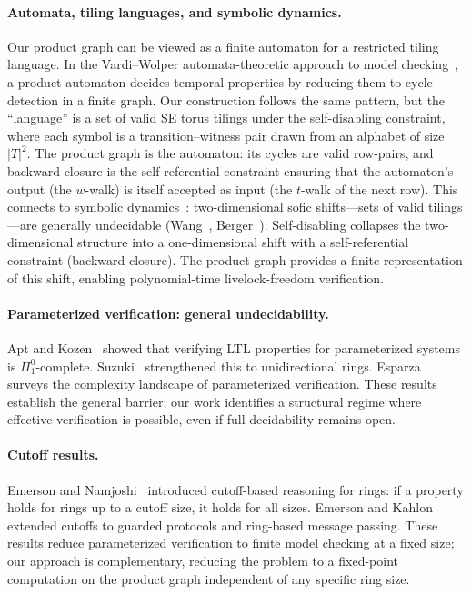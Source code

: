 \documentclass[11pt]{article}
\begin{document}
\paragraph{Automata, tiling languages, and symbolic dynamics.} Our product graph can be viewed as a finite automaton for a restricted tiling language. In the Vardi--Wolper automata-theoretic approach to model checking~\cite{vardi-wolper}, a product automaton decides temporal properties by reducing them to cycle detection in a finite graph. Our construction follows the same pattern, but the ``language'' is a set of valid SE torus tilings under the self-disabling constraint, where each symbol is a transition--witness pair drawn from an alphabet of size $|T|^2$. The product graph is the automaton: its cycles are valid row-pairs, and backward closure is the self-referential constraint ensuring that the automaton's output (the $w$-walk) is itself accepted as input (the $t$-walk of the next row). This connects to symbolic dynamics~\cite{lind-marcus}: two-dimensional sofic shifts---sets of valid tilings---are generally undecidable (Wang~\cite{wang-tiles}, Berger~\cite{berger}). Self-disabling collapses the two-dimensional structure into a one-dimensional shift with a self-referential constraint (backward closure). The product graph provides a finite representation of this shift, enabling polynomial-time livelock-freedom verification.

\paragraph{Parameterized verification: general undecidability.} Apt and Kozen~\cite{apt-kozen} showed that verifying LTL properties for parameterized systems is $\Pi^0_1$-complete. Suzuki~\cite{suzuki} strengthened this to unidirectional rings. Esparza~\cite{esparza} surveys the complexity landscape of parameterized verification. These results establish the general barrier; our work identifies a structural regime where effective verification is possible, even if full decidability remains open.

\paragraph{Cutoff results.} Emerson and Namjoshi~\cite{emerson-namjoshi} introduced cutoff-based reasoning for rings: if a property holds for rings up to a cutoff size, it holds for all sizes. Emerson and Kahlon~\cite{emerson-kahlon} extended cutoffs to guarded protocols and ring-based message passing. These results reduce parameterized verification to finite model checking at a fixed size; our approach is complementary, reducing the problem to a fixed-point computation on the product graph independent of any specific ring size.
\end{document}
